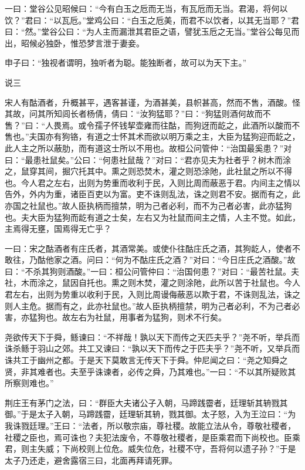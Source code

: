 \documentclass[]{article}
\begin{document}
一曰：堂谷公见昭候曰：``今有白玉之卮而无当，有瓦卮而无当。君渴，将何以饮？''君曰：``以瓦卮。''堂鸡公曰：``白玉之卮美，而君不以饮者，以其无当耶？''君曰：``然。''堂谷公曰：``为人主而漏泄其君臣之语，譬犹玉卮之无当。''堂谷公每见而出，昭候必独卧，惟恐梦言泄于妻妾。

申子曰：``独视者谓明，独听者为聪。能独断者，故可以为天下主。''

说三

宋人有酤酒者，升概甚平，遇客甚谨，为酒甚美，县帜甚高，然而不售，酒酸。怪其故，问其所知闾长者杨倩，倩曰：``汝狗猛耶？''曰：``狗猛则酒何故而不售？''曰：``人畏焉。或令孺子怀钱挈壶雍而往酤，而狗迓而龁之，此酒所以酸而不售也。''夫国亦有狗铬，有道之士怀其术而欲以明万乘之主，大臣为猛狗迎而龁之，此人主之所以蔽肋，而有道这士所以不用也。故桓公问管仲：``治国最奚患？''对曰：``最患社鼠矣。''公曰：``何患社鼠哉？''对曰：``君亦见夫为社者乎？树木而涂之，鼠穿其间，掘穴托其中。熏之则恐焚木，灌之则恐涂阤，此社鼠之所以不得也。今人君之左右，出则为势重而收利于民，入则比周而蔽恶于君。内间主之情以告外，外内为重，诸臣百吏以为富。吏不诛则乱法，诛之则君不安。据而有之，此亦国之社鼠也。''故人臣执柄而擅禁，明为己者必利，而不为己者必害，此亦猛狗也。夫大臣为猛狗而龁有道之士矣，左右又为社鼠而间主之情，人主不觉。如此，主焉得无壅，国焉得无亡乎？

一曰：宋之酤酒者有庄氏者，其酒常美。或使仆往酤庄氏之酒，其狗龁人，使者不敢往，乃酤他家之酒。问曰：``何为不酤庄氏之酒？''对曰：``今日庄氏之酒酸。''故曰：``不杀其狗则酒酸。''一曰：桓公问管仲曰：``治国何患？''对曰：``最苦社鼠。夫社，木而涂之，鼠因自托也。熏之则木焚，灌之则涂阤，此所以苦于社鼠也。今人君左右，出则为势重以收利于民，入则比周谩侮蔽恶以欺于君，不诛则乱法，诛之则人主危。据而有之，此亦社鼠也。''故人臣执柄擅禁，明为己者必利，不为己者必害，亦猛狗也。故左右为社鼠，用事者为猛狗，则术不行矣。

尧欲传天下于舜，鲧谏曰：``不祥哉！孰以天下而传之天匹夫乎？''尧不听，举兵而诛杀鲧于羽山之郊。共工又谏曰：``孰以天下而传之于匹夫乎？''尧不听，又举兵而诛共工于幽州之都。于是天下莫敢言无传天下于舜。仲尼闻之曰：``尧之知舜之贤，非其难者也。夫至乎诛谏者，必传之舜，乃其难也。''一曰：``不以其所疑败其所察则难也。''

荆庄王有茅门之法，曰：``群臣大夫诸公子入朝，马蹄践霤者，廷理斩其辀戮其御。''于是太子入朝，马蹄践霤，廷理斩其辀，戮其御。太子怒，入为王泣曰：``为我诛戮廷理。''王曰：``法者，所以敬宗庙，尊社稷。故能立法从令，尊敬社稷者，社稷之臣也，焉可诛也？夫犯法废令，不尊敬社稷者，是臣乘君而下尚校也。臣乘君，则主失威；下尚校则上位危。威失位危，社稷不守，吾将何以遗子孙？''于是太子乃还走，避舍露宿三曰，北面再拜请死罪。
\end{document}
